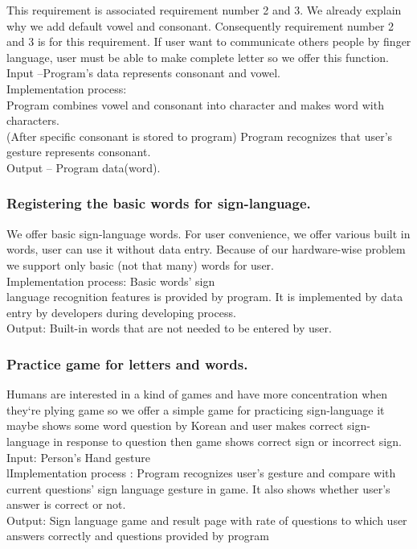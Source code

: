 \documentclass[10pt,journal,compsoc]{IEEEtran}
\begin{document}
This requirement is associated requirement number 2 and 3. We already explain why we add default vowel and consonant. Consequently requirement number 2 and 3 is for this requirement. If user want to communicate others people by finger language, user must be able to make complete letter so we offer this function.
\\Input –Program's data represents consonant and vowel.
\\Implementation process:
\\Program combines vowel and consonant into character and makes word with characters.
\\(After specific consonant is stored to program) Program recognizes that user’s gesture represents consonant.
\\Output – Program data(word).

\subsubsection{Registering the basic words for sign-language.}

We offer basic sign-language words. For user convenience, we offer various built in words, user can use it without data entry. Because of our hardware-wise problem we support only basic (not that many) words for user.
\\Implementation process:  Basic words’ sign 
\\language recognition features is provided by program. It is implemented by data entry by developers during developing process.
\\Output: Built-in words that are not needed to be entered by user.

\subsubsection{Practice game for letters and words.}

Humans are interested in a kind of games and have more concentration when they`re plying game so we offer a simple game for practicing sign-language it maybe shows some word question by Korean and user makes correct sign-language in response to question then game shows correct sign or incorrect sign.
\\Input: Person's Hand gesture
\\lImplementation process : Program recognizes user’s gesture and compare with current questions’ sign language gesture in game. It also shows whether user’s answer is correct or not.
\\Output: Sign language game and result page with rate of questions to which user answers correctly and questions provided by program
\end{document}
